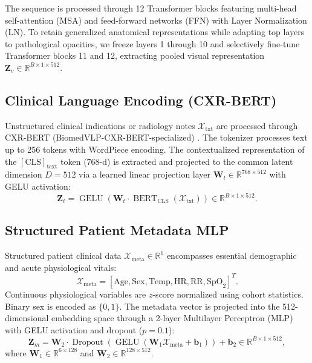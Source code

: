 \documentclass[conference]{IEEEtran}
\begin{document}
The sequence is processed through 12 Transformer blocks featuring multi-head self-attention (MSA) and feed-forward networks (FFN) with Layer Normalization (LN). To retain generalized anatomical representations while adapting top layers to pathological opacities, we freeze layers 1 through 10 and selectively fine-tune Transformer blocks 11 and 12, extracting pooled visual representation $\mathbf{Z}_v \in \mathbb{R}^{B \times 1 \times 512}$.

\subsection{Clinical Language Encoding (CXR-BERT)}
Unstructured clinical indications or radiology notes $\mathcal{X}_{\mathrm{txt}}$ are processed through CXR-BERT (\textsf{BiomedVLP-CXR-BERT-specialized}) \cite{boecking2022making}. The tokenizer processes text up to 256 tokens with WordPiece encoding. The contextualized representation of the $[\mathrm{CLS}]_{\mathrm{text}}$ token ($768\text{-d}$) is extracted and projected to the common latent dimension $D=512$ via a learned linear projection layer $\mathbf{W}_t \in \mathbb{R}^{768 \times 512}$ with GELU activation:
\begin{equation}
\mathbf{Z}_t = \operatorname{GELU}(\mathbf{W}_t \cdot \operatorname{BERT}_{\mathrm{CLS}}(\mathcal{X}_{\mathrm{txt}})) \in \mathbb{R}^{B \times 1 \times 512}.
\end{equation}

\subsection{Structured Patient Metadata MLP}
Structured patient clinical data $\mathcal{X}_{\mathrm{meta}} \in \mathbb{R}^6$ encompasses essential demographic and acute physiological vitals:
\begin{equation}
\mathcal{X}_{\mathrm{meta}} = [\mathrm{Age}, \mathrm{Sex}, \mathrm{Temp}, \mathrm{HR}, \mathrm{RR}, \mathrm{SpO}_2]^T.
\end{equation}
Continuous physiological variables are $z$-score normalized using cohort statistics. Binary sex is encoded as $\{0, 1\}$. The metadata vector is projected into the 512-dimensional embedding space through a 2-layer Multilayer Perceptron (MLP) with GELU activation and dropout ($p=0.1$):
\begin{equation}
\mathbf{Z}_m = \mathbf{W}_2 \cdot \operatorname{Dropout}(\operatorname{GELU}(\mathbf{W}_1 \mathcal{X}_{\mathrm{meta}} + \mathbf{b}_1)) + \mathbf{b}_2 \in \mathbb{R}^{B \times 1 \times 512},
\end{equation}
where $\mathbf{W}_1 \in \mathbb{R}^{6 \times 128}$ and $\mathbf{W}_2 \in \mathbb{R}^{128 \times 512}$.
\end{document}
